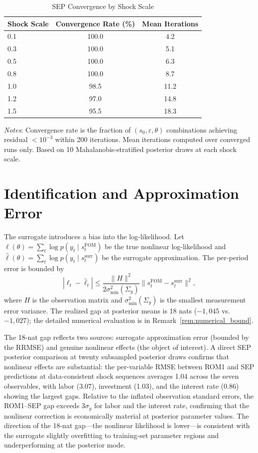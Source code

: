 \documentclass[12pt]{article}
\theoremstyle{plain}
\theoremstyle{definition}
\theoremstyle{remark}
\newcommand{\Sigmay}{\Sigma_y}
\begin{document}
\begin{table}[htbp]
\centering
\caption{SEP Convergence by Shock Scale}
\label{tab:shock_scale_grid}
\begin{tabular}{lcc}
\toprule
Shock Scale & Convergence Rate (\%) & Mean Iterations \\
\midrule
0.1 & 100.0 & 4.2 \\
0.3 & 100.0 & 5.1 \\
0.5 & 100.0 & 6.3 \\
0.8 & 100.0 & 8.7 \\
1.0 & 98.5 & 11.2 \\
1.2 & 97.0 & 14.8 \\
1.5 & 95.5 & 18.3 \\
\bottomrule
\end{tabular}
\smallskip
{\footnotesize \textit{Notes}: Convergence rate is the fraction of $(s_0, \varepsilon, \theta)$ combinations achieving residual $< 10^{-3}$ within 200 iterations. Mean iterations computed over converged runs only. Based on 10 Mahalanobis-stratified posterior draws at each shock scale.}
\end{table}


\section{Identification and Approximation Error}
\label{sec:identification}

The surrogate introduces a bias into the log-likelihood. Let $\ell(\theta) = \sum_t \log p(y_t \mid s_t^{\text{FOM}})$ be the true nonlinear log-likelihood and $\hat{\ell}(\theta) = \sum_t \log p(y_t \mid s_t^{\text{surr}})$ be the surrogate approximation. The per-period error is bounded by
\begin{equation}
|\ell_t - \hat{\ell}_t| \leq \frac{\|H\|^2}{2\sigma_{\min}^2(\Sigmay)} \|s_t^{\text{FOM}} - s_t^{\text{surr}}\|^2,
\label{eq:ll_bias_bound}
\end{equation}
where $H$ is the observation matrix and $\sigma_{\min}^2(\Sigmay)$ is the smallest measurement error variance. The realized gap at posterior means is 18 nats ($-1{,}045$ vs.\ $-1{,}027$); the detailed numerical evaluation is in Remark~\ref{rem:numerical_bound}.

The 18-nat gap reflects two sources: surrogate approximation error (bounded by the RRMSE) and genuine nonlinear effects (the object of interest). A direct SEP posterior comparison at twenty subsampled posterior draws confirms that nonlinear effects are substantial: the per-variable RMSE between ROM1 and SEP predictions at data-consistent shock sequences averages 1.04 across the seven observables, with labor (3.07), investment (1.03), and the interest rate (0.86) showing the largest gaps. Relative to the inflated observation standard errors, the ROM1--SEP gap exceeds $3\sigma_y$ for labor and the interest rate, confirming that the nonlinear correction is economically material at posterior parameter values. The direction of the 18-nat gap---the nonlinear likelihood is lower---is consistent with the surrogate slightly overfitting to training-set parameter regions and underperforming at the posterior mode.
\end{document}
